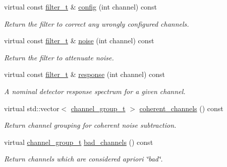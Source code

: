 \begin{DoxyCompactItemize}
virtual const \hyperlink{class_wire_cell_1_1_i_channel_noise_database_a0acbae29743542eb1c652f7a56e692f5}{filter\+\_\+t} \& \hyperlink{class_wire_cell_1_1_sig_proc_1_1_simple_channel_noise_d_b_a3eabaf3d48c127aaa6c594c682e6a77a}{config} (int channel) const
\begin{DoxyCompactList}\small\item\em Return the filter to correct any wrongly configured channels. \end{DoxyCompactList}\item 
virtual const \hyperlink{class_wire_cell_1_1_i_channel_noise_database_a0acbae29743542eb1c652f7a56e692f5}{filter\+\_\+t} \& \hyperlink{class_wire_cell_1_1_sig_proc_1_1_simple_channel_noise_d_b_ab0b17e111bc6617ac4702610b262ed2f}{noise} (int channel) const
\begin{DoxyCompactList}\small\item\em Return the filter to attenuate noise. \end{DoxyCompactList}\item 
virtual const \hyperlink{class_wire_cell_1_1_i_channel_noise_database_a0acbae29743542eb1c652f7a56e692f5}{filter\+\_\+t} \& \hyperlink{class_wire_cell_1_1_sig_proc_1_1_simple_channel_noise_d_b_ac86433de014502928205161b6ea93ba0}{response} (int channel) const
\begin{DoxyCompactList}\small\item\em A nominal detector response spectrum for a given channel. \end{DoxyCompactList}\item 
virtual std\+::vector$<$ \hyperlink{class_wire_cell_1_1_i_channel_noise_database_a7fedd6ab67ba4e7eeb8cf182cc9dc6b1}{channel\+\_\+group\+\_\+t} $>$ \hyperlink{class_wire_cell_1_1_sig_proc_1_1_simple_channel_noise_d_b_a157979de597ebfcf99238544ffd82c0e}{coherent\+\_\+channels} () const
\begin{DoxyCompactList}\small\item\em Return channel grouping for coherent noise subtraction. \end{DoxyCompactList}\item 
virtual \hyperlink{class_wire_cell_1_1_i_channel_noise_database_a7fedd6ab67ba4e7eeb8cf182cc9dc6b1}{channel\+\_\+group\+\_\+t} \hyperlink{class_wire_cell_1_1_sig_proc_1_1_simple_channel_noise_d_b_abc31faca2ae9ee69ebfd01b9edd36289}{bad\+\_\+channels} () const
\begin{DoxyCompactList}\small\item\em Return channels which are considered a\textquotesingle{}priori \char`\"{}bad\char`\"{}. \end{DoxyCompactList}\item 

\end{DoxyCompactItemize}
